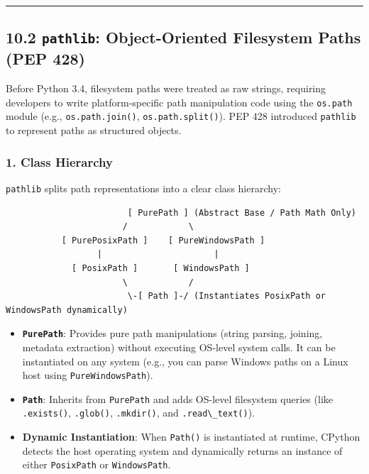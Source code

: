 \begin{center}\rule{0.5\linewidth}{0.5pt}\end{center}

\hypertarget{pathlib-object-oriented-filesystem-paths-pep-428}{%
\subsection{\texorpdfstring{10.2 \texttt{pathlib}: Object-Oriented
Filesystem Paths (PEP
428)}{10.2 pathlib: Object-Oriented Filesystem Paths (PEP 428)}}\label{pathlib-object-oriented-filesystem-paths-pep-428}}

Before Python 3.4, filesystem paths were treated as raw strings,
requiring developers to write platform-specific path manipulation code
using the \passthrough{\lstinline!os.path!} module (e.g.,
\passthrough{\lstinline!os.path.join()!},
\passthrough{\lstinline!os.path.split()!}). PEP 428 introduced
\passthrough{\lstinline!pathlib!} to represent paths as structured
objects.

\hypertarget{class-hierarchy}{%
\subsubsection{1. Class Hierarchy}\label{class-hierarchy}}

\passthrough{\lstinline!pathlib!} splits path representations into a
clear class hierarchy:

\begin{lstlisting}
                        [ PurePath ] (Abstract Base / Path Math Only)
                       /            \
           [ PurePosixPath ]    [ PureWindowsPath ]
                  |                      |
             [ PosixPath ]       [ WindowsPath ]
                       \            /
                        \-[ Path ]-/ (Instantiates PosixPath or WindowsPath dynamically)
\end{lstlisting}

\begin{itemize}
\tightlist
\item
  \textbf{\passthrough{\lstinline!PurePath!}}: Provides pure path
  manipulations (string parsing, joining, metadata extraction) without
  executing OS-level system calls. It can be instantiated on any system
  (e.g., you can parse Windows paths on a Linux host using
  \passthrough{\lstinline!PureWindowsPath!}).
\item
  \textbf{\passthrough{\lstinline!Path!}}: Inherits from
  \passthrough{\lstinline!PurePath!} and adds OS-level filesystem
  queries (like \passthrough{\lstinline!.exists()!},
  \passthrough{\lstinline!.glob()!}, \passthrough{\lstinline!.mkdir()!},
  and \passthrough{\lstinline!.read\_text()!}).
\item
  \textbf{Dynamic Instantiation}: When \passthrough{\lstinline!Path()!}
  is instantiated at runtime, CPython detects the host operating system
  and dynamically returns an instance of either
  \passthrough{\lstinline!PosixPath!} or
  \passthrough{\lstinline!WindowsPath!}.
\end{itemize}

